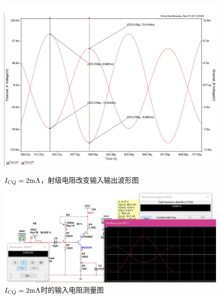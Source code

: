 \documentclass[UTF8,a4paper]{ctexart}
\begin{document}
\begin{figure}
\centering
\includegraphics[width=\textwidth]{Capture.JPG}
\caption{$I_{CQ}=2\rm{mA}$，射级电阻改变输入输出波形图}
\label{RE1}
\includegraphics[width=\textwidth]{speri.JPG}
\caption{$I_{CQ}=2\rm{mA}$时的输入电阻测量图}
\label{RERI}
\end{figure}
\end{document}
